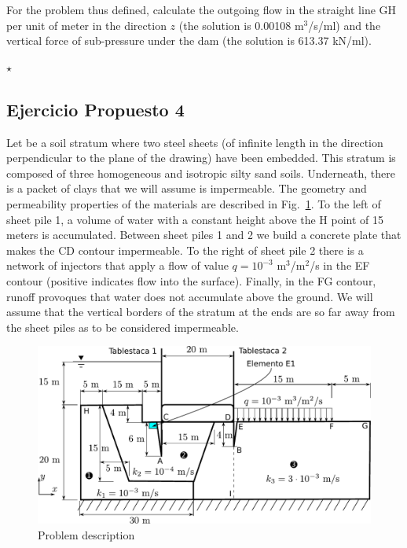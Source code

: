 For the problem thus defined, calculate the outgoing flow in the
straight line GH per unit of meter in the direction $z$ (the solution
is 0.00108 m$^3$/s/ml) and the vertical force of sub-pressure under
the dam (the solution is 613.37 kN/ml). \vspace{3mm}

\hspace{20mm}\hrulefill$\star$\hrulefill\hspace{20mm}

\clearpage \newpage
\subsection{Ejercicio Propuesto 4}

Let be a soil stratum where two steel sheets (of infinite length in
the direction perpendicular to the plane of the drawing) have been
embedded. This stratum is composed of three homogeneous and isotropic
silty sand soils.  Underneath, there is a packet of clays that we will
assume is impermeable. The geometry and permeability properties of the
materials are described in Fig.~\ref{enup04}.  To the left of sheet
pile 1, a volume of water with a constant height above the H point of
15 meters is accumulated.  Between sheet piles 1 and 2 we build a
concrete plate that makes the CD contour impermeable.  To the right of
sheet pile 2 there is a network of injectors that apply a flow of
value $q=10^{-3}$ m$^3$/m$^2$/s in the EF contour (positive indicates
flow into the surface).  Finally, in the FG contour, runoff provoques
that water does not accumulate above the ground. We will assume that
the vertical borders of the stratum at the ends are so far away from
the sheet piles as to be considered impermeable.

\vspace{-2mm}
\begin{figure}[!h]
  \centering
  \includegraphics[width=1.0\linewidth]{./body/images/enup04}
  \caption{Problem description}
  \label{enup04}
\end{figure}

